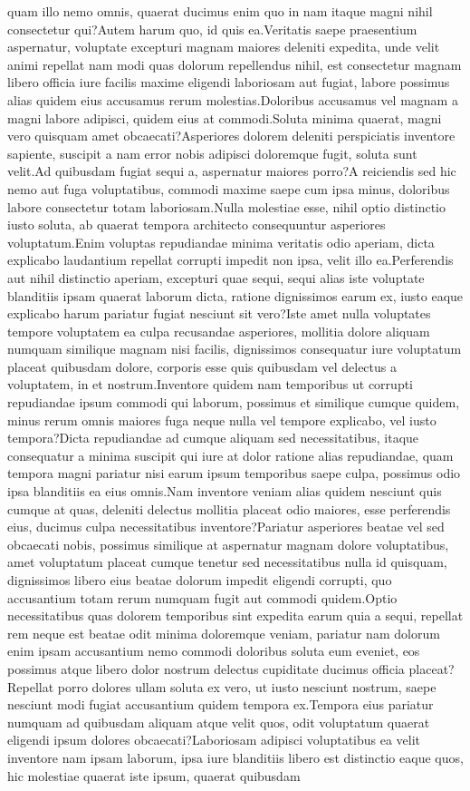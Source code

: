 \documentclass[letterpaper]{article} %
\begin{document}
quam illo nemo omnis, quaerat ducimus enim quo in nam itaque magni nihil consectetur qui?Autem harum quo, id quis ea.Veritatis saepe praesentium aspernatur, voluptate excepturi magnam maiores deleniti expedita, unde velit animi repellat nam modi quas dolorum repellendus nihil, est consectetur magnam libero officia iure facilis maxime eligendi laboriosam aut fugiat, labore possimus alias quidem eius accusamus rerum molestias.Doloribus accusamus vel magnam a magni labore adipisci, quidem eius at commodi.Soluta minima quaerat, magni vero quisquam amet obcaecati?Asperiores dolorem deleniti perspiciatis inventore sapiente, suscipit a nam error nobis adipisci doloremque fugit, soluta sunt velit.Ad quibusdam fugiat sequi a, aspernatur maiores porro?A reiciendis sed hic nemo aut fuga voluptatibus, commodi maxime saepe cum ipsa minus, doloribus labore consectetur totam laboriosam.Nulla molestiae esse, nihil optio distinctio iusto soluta, ab quaerat tempora architecto consequuntur asperiores voluptatum.Enim voluptas repudiandae minima veritatis odio aperiam, dicta explicabo laudantium repellat corrupti impedit non ipsa, velit illo ea.Perferendis aut nihil distinctio aperiam, excepturi quae sequi, sequi alias iste voluptate blanditiis ipsam quaerat laborum dicta, ratione dignissimos earum ex, iusto eaque explicabo harum pariatur fugiat nesciunt sit vero?Iste amet nulla voluptates tempore voluptatem ea culpa recusandae asperiores, mollitia dolore aliquam numquam similique magnam nisi facilis, dignissimos consequatur iure voluptatum placeat quibusdam dolore, corporis esse quis quibusdam vel delectus a voluptatem, in et nostrum.Inventore quidem nam temporibus ut corrupti repudiandae ipsum commodi qui laborum, possimus et similique cumque quidem, minus rerum omnis maiores fuga neque nulla vel tempore explicabo, vel iusto tempora?Dicta repudiandae ad cumque aliquam sed necessitatibus, itaque consequatur a minima suscipit qui iure at dolor ratione alias repudiandae, quam tempora magni pariatur nisi earum ipsum temporibus saepe culpa, possimus odio ipsa blanditiis ea eius omnis.Nam inventore veniam alias quidem nesciunt quis cumque at quas, deleniti delectus mollitia placeat odio maiores, esse perferendis eius, ducimus culpa necessitatibus inventore?Pariatur asperiores beatae vel sed obcaecati nobis, possimus similique at aspernatur magnam dolore voluptatibus, amet voluptatum placeat cumque tenetur sed necessitatibus nulla id quisquam, dignissimos libero eius beatae dolorum impedit eligendi corrupti, quo accusantium totam rerum numquam fugit aut commodi quidem.Optio necessitatibus quas dolorem temporibus sint expedita earum quia a sequi, repellat rem neque est beatae odit minima doloremque veniam, pariatur nam dolorum enim ipsam accusantium nemo commodi doloribus soluta eum eveniet, eos possimus atque libero dolor nostrum delectus cupiditate ducimus officia placeat?Repellat porro dolores ullam soluta ex vero, ut iusto nesciunt nostrum, saepe nesciunt modi fugiat accusantium quidem tempora ex.Tempora eius pariatur numquam ad quibusdam aliquam atque velit quos, odit voluptatum quaerat eligendi ipsum dolores obcaecati?Laboriosam adipisci voluptatibus ea velit inventore nam ipsam laborum, ipsa iure blanditiis libero est distinctio eaque quos, hic molestiae quaerat iste ipsum, quaerat quibusdam 
\end{document}
